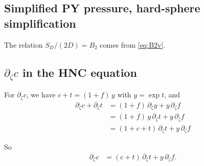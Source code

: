 \documentclass[preprint]{revtex4-1}
\numberwithin{equation}{subsection}
\numberwithin{table}{section}
\begin{document}
\subsection{Simplified PY pressure, hard-sphere simplification}

The relation $S_D/(2D) = B_2$ comes from \eqref{eq:B2v}.


\subsection{$\partial_\zeta c$ in the HNC equation}

For $\partial_\zeta c$, we have
$c + t = (1 + f) \, y$
with
$y = \exp t$,
and
\begin{align*}
  \partial_\zeta c + \partial_\zeta t
&= (1 + f) \, \partial_\zeta y
+ y \, \partial_\zeta f
\\
&= (1 + f) \, y \, \partial_\zeta t
+ y \, \partial_\zeta f
\\
&= (1 + c + t) \, \partial_\zeta t
+ y \, \partial_\zeta f
\end{align*}

So
\begin{align*}
  \partial_\zeta c
&= (c + t) \, \partial_\zeta t
+ y \, \partial_\zeta f.
\end{align*}



\end{document}
